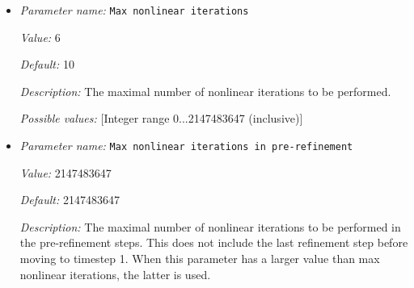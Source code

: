 \begin{itemize}
{\it Value:} 1e-4


{\it Default:} 1e-7


{\it Description:} A relative tolerance up to which the linear Stokes systems in each time or nonlinear step should be solved. The absolute tolerance will then be $\| M x_0 - F \| \cdot \text{tol}$, where $x_0 = (0,p_0)$ is the initial guess of the pressure, $M$ is the system matrix, F is the right-hand side, and tol is the parameter specified here. We include the initial guess of the pressure to remove the dependency of the tolerance on the static pressure. A given tolerance value of 1 would mean that a zero solution vector is an acceptable solution since in that case the norm of the residual of the linear system equals the norm of the right hand side. A given tolerance of 0 would mean that the linear system has to be solved exactly, since this is the only way to obtain a zero residual.

In practice, you should choose the value of this parameter to be so that if you make it smaller the results of your simulation do not change any more (qualitatively) whereas if you make it larger, they do. For most cases, the default value should be sufficient. In fact, a tolerance of 1e-4 might be accurate enough.


{\it Possible values:} [Double 0...1 (inclusive)]
\item {\it Parameter name:} {\tt Max nonlinear iterations}
\label{parameters:Max nonlinear iterations}


{\it Value:} 6


{\it Default:} 10


{\it Description:} The maximal number of nonlinear iterations to be performed.


{\it Possible values:} [Integer range 0...2147483647 (inclusive)]
\item {\it Parameter name:} {\tt Max nonlinear iterations in pre-refinement}
\label{parameters:Max nonlinear iterations in pre-refinement}


{\it Value:} 2147483647


{\it Default:} 2147483647


{\it Description:} The maximal number of nonlinear iterations to be performed in the pre-refinement steps. This does not include the last refinement step before moving to timestep 1. When this parameter has a larger value than max nonlinear iterations, the latter is used.



\end{itemize}
